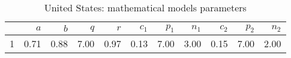 \begin{table}[H]
\centering
\begin{tabular}{rrrrrrrrrrr}
  \hline
 & $a$ & $b$ & $q$ & $r$ & $c_1$ & $p_1$ & $n_1$ & $c_2$ & $p_2$ & $n_2$ \\ 
  \hline
1 & 0.71 & 0.88 & 7.00 & 0.97 & 0.13 & 7.00 & 3.00 & 0.15 & 7.00 & 2.00 \\ 
   \hline
\end{tabular}
\caption{United States: mathematical models parameters} 
\label{fig:United Statesmathmodelpars}
\end{table}
